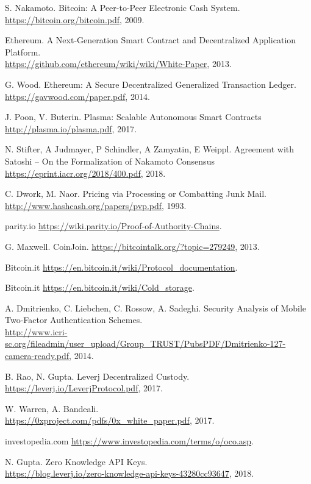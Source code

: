 \documentclass[12pt,a4paper]{article}
\begin{document}
\begin{thebibliography}{999}
S. Nakamoto. Bitcoin: A Peer-to-Peer Electronic Cash System. \\
\url{https://bitcoin.org/bitcoin.pdf}, 2009.

Ethereum. A Next-Generation Smart Contract and Decentralized Application Platform. \\
\url{https://github.com/ethereum/wiki/wiki/White-Paper}, 2013.

G. Wood. Ethereum: A Secure Decentralized Generalized Transaction Ledger.
\url{https://gavwood.com/paper.pdf}, 2014.

J. Poon, V. Buterin. Plasma: Scalable Autonomous Smart Contracts\\
\url{http://plasma.io/plasma.pdf}, 2017.

N. Stifter, A Judmayer, P Schindler, A Zamyatin, E Weippl. Agreement with Satoshi – On the Formalization of Nakamoto Consensus\\
\url{https://eprint.iacr.org/2018/400.pdf}, 2018.

C. Dwork, M. Naor. Pricing via Processing or Combatting Junk Mail.\\ \url{http://www.hashcash.org/papers/pvp.pdf}, 1993.

parity.io \url{https://wiki.parity.io/Proof-of-Authority-Chains}.

G. Maxwell. CoinJoin. \url{https://bitcointalk.org/?topic=279249}, 2013.

Bitcoin.it \url{https://en.bitcoin.it/wiki/Protocol_documentation}.

Bitcoin.it \url{https://en.bitcoin.it/wiki/Cold_storage}.

A. Dmitrienko, C. Liebchen, C. Rossow, A. Sadeghi. Security Analysis of Mobile Two-Factor Authentication Schemes. \\
\url{http://www.icri-sc.org/fileadmin/user_upload/Group_TRUST/PubsPDF/Dmitrienko-127-camera-ready.pdf}, 2014.

B. Rao, N. Gupta. Leverj Decentralized Custody. \\
\url{https://leverj.io/LeverjProtocol.pdf}, 2017.

W. Warren, A. Bandeali. \\
\url{https://0xproject.com/pdfs/0x_white_paper.pdf}, 2017.

investopedia.com \url{https://www.investopedia.com/terms/o/oco.asp}.

N. Gupta. Zero Knowledge API Keys. \\ \url{https://blog.leverj.io/zero-knowledge-api-keys-43280cc93647}, 2018.
\end{thebibliography}
\ClearShipoutPictureBG
\end{document}
